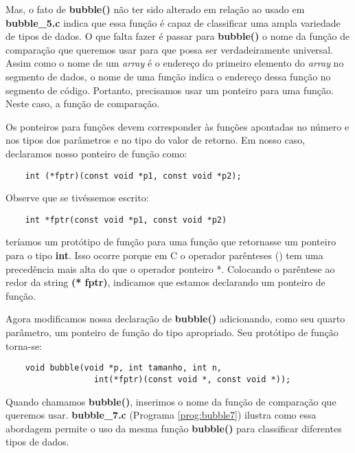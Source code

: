 

Mas, o fato de \textbf{bubble()} não ter sido alterado em relação ao usado em \textbf{bubble\_5.c} indica que essa função é capaz de classificar uma ampla variedade de tipos de dados. O que falta fazer é passar para \textbf{bubble()} o nome da função de comparação que queremos usar para que possa ser verdadeiramente universal. Assim como o nome de um \textit{array} é o endereço do primeiro elemento do \textit{array} no segmento de dados, o nome de uma função indica o endereço dessa função no segmento de código. Portanto, precisamos usar um ponteiro para uma função. Neste caso, a função de comparação.

Os ponteiros para funções devem corresponder às funções apontadas no número e nos tipos dos parâmetros e no tipo do valor de retorno. Em nosso caso, declaramos nosso ponteiro de função como:
\begin{lstlisting}
	int (*fptr)(const void *p1, const void *p2);
\end{lstlisting}

Observe que se tivéssemos escrito:
\begin{lstlisting}
	int *fptr(const void *p1, const void *p2)
\end{lstlisting}
teríamos um protótipo de função para uma função que retornasse um ponteiro para o tipo \textbf{int}. Isso ocorre porque em C o operador parênteses () tem uma precedência mais alta do que o operador ponteiro *. Colocando o parêntese ao redor da string \textbf{(* fptr)}, indicamos que estamos declarando um ponteiro de função.

Agora modificamos nossa declaração de \textbf{bubble()} adicionando, como seu quarto parâmetro, um ponteiro de função do tipo apropriado. Seu protótipo de função torna-se:
\begin{lstlisting}
	void bubble(void *p, int tamanho, int n, 
		          int(*fptr)(const void *, const void *));
\end{lstlisting}

Quando chamamos \textbf{bubble()}, inserimos o nome da função de comparação que queremos usar. \textbf{bubble\_7.c} (Programa \ref{prog:bubble7})  ilustra como essa abordagem permite o uso da mesma função \textbf{bubble()} para classificar diferentes tipos de dados.

